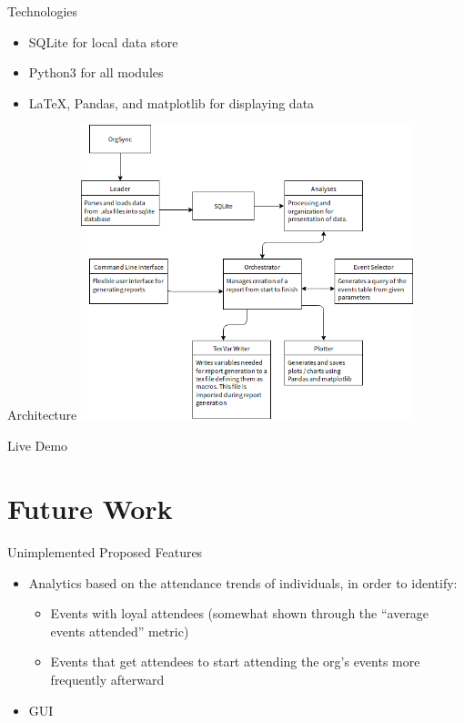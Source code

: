 \documentclass{beamer}
\begin{document}
\begin{frame}{Technologies}
    \begin{itemize}
        \item SQLite for local data store
        \item Python3 for all modules
        \item LaTeX, Pandas, and matplotlib for displaying data
    \end{itemize}
\end{frame}

\begin{frame}{Architecture}
    \includegraphics[width=3.8in]{./media/architecture.png}
\end{frame}


\begin{frame}[standout]
    Live Demo
\end{frame}


\section{Future Work}

\begin{frame}{Unimplemented Proposed Features}
    \begin{itemize}
        \item Analytics based on the attendance trends of individuals, in order to identify:
            \begin{itemize}
                \item Events with loyal attendees (somewhat shown through the ``average events attended'' metric)
                \item Events that get attendees to start attending the org's events more frequently afterward
            \end{itemize}
        \item GUI
    \end{itemize}
\end{frame}
\end{document}
